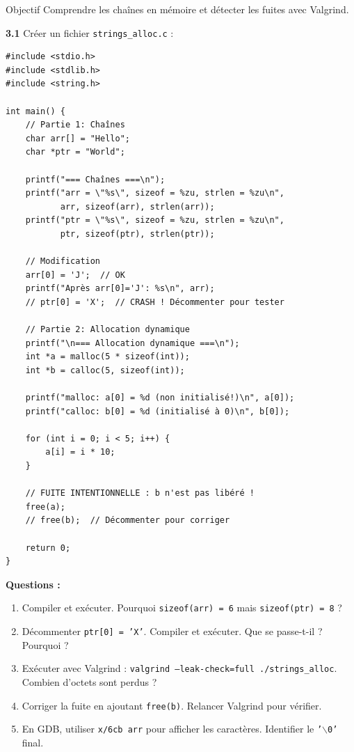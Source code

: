 \documentclass[10pt,a4paper]{article}
\begin{document}
\begin{exercicebox}{Objectif}
Comprendre les chaînes en mémoire et détecter les fuites avec Valgrind.
\end{exercicebox}

\textbf{3.1} Créer un fichier \texttt{strings\_alloc.c} :

\begin{lstlisting}
#include <stdio.h>
#include <stdlib.h>
#include <string.h>

int main() {
    // Partie 1: Chaînes
    char arr[] = "Hello";
    char *ptr = "World";
    
    printf("=== Chaînes ===\n");
    printf("arr = \"%s\", sizeof = %zu, strlen = %zu\n", 
           arr, sizeof(arr), strlen(arr));
    printf("ptr = \"%s\", sizeof = %zu, strlen = %zu\n", 
           ptr, sizeof(ptr), strlen(ptr));
    
    // Modification
    arr[0] = 'J';  // OK
    printf("Après arr[0]='J': %s\n", arr);
    // ptr[0] = 'X';  // CRASH ! Décommenter pour tester
    
    // Partie 2: Allocation dynamique
    printf("\n=== Allocation dynamique ===\n");
    int *a = malloc(5 * sizeof(int));
    int *b = calloc(5, sizeof(int));
    
    printf("malloc: a[0] = %d (non initialisé!)\n", a[0]);
    printf("calloc: b[0] = %d (initialisé à 0)\n", b[0]);
    
    for (int i = 0; i < 5; i++) {
        a[i] = i * 10;
    }
    
    // FUITE INTENTIONNELLE : b n'est pas libéré !
    free(a);
    // free(b);  // Décommenter pour corriger
    
    return 0;
}
\end{lstlisting}

\textbf{Questions :}
\begin{enumerate}[label=\alph*)]
    \item Compiler et exécuter. Pourquoi \texttt{sizeof(arr) = 6} mais \texttt{sizeof(ptr) = 8} ?
    \item Décommenter \texttt{ptr[0] = 'X'}. Compiler et exécuter. Que se passe-t-il ? Pourquoi ?
    \item Exécuter avec Valgrind : \texttt{valgrind --leak-check=full ./strings\_alloc}. Combien d'octets sont perdus ?
    \item Corriger la fuite en ajoutant \texttt{free(b)}. Relancer Valgrind pour vérifier.
    \item En GDB, utiliser \texttt{x/6cb arr} pour afficher les caractères. Identifier le \texttt{'$\backslash$0'} final.
\end{enumerate}
\end{document}
